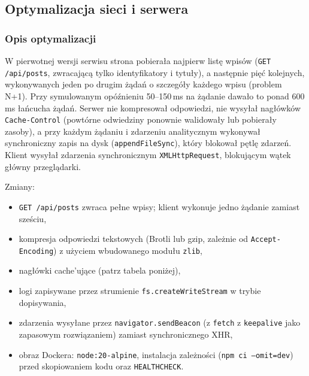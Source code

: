 \makeatletter
{}
\makeatother


\subsection{Optymalizacja sieci i serwera}
\subsubsection{Opis optymalizacji}

W pierwotnej wersji serwisu strona pobierała najpierw listę wpisów (\texttt{GET /api/posts},
zwracającą tylko identyfikatory i tytuły), a następnie pięć kolejnych, wykonywanych
jeden po drugim żądań o szczegóły każdego wpisu (problem N+1). Przy symulowanym opóźnieniu
50--150\,ms na żądanie dawało to ponad 600\,ms łańcucha żądań. Serwer nie kompresował
odpowiedzi, nie wysyłał nagłówków \texttt{Cache-Control} (powtórne odwiedziny
ponownie walidowały lub pobierały zasoby), a przy każdym żądaniu i zdarzeniu
analitycznym wykonywał synchroniczny zapis na dysk (\texttt{appendFileSync}),
który blokował pętlę zdarzeń. Klient wysyłał zdarzenia synchronicznym
\texttt{XMLHttpRequest}, blokującym wątek główny przeglądarki.

Zmiany:
\begin{itemize}
  \item \texttt{GET /api/posts} zwraca pełne wpisy; klient wykonuje jedno żądanie
    zamiast sześciu,
  \item kompresja odpowiedzi tekstowych (Brotli lub gzip, zależnie od
    \texttt{Accept-Encoding}) z użyciem wbudowanego modułu \texttt{zlib},
  \item nagłówki cache'ujące (patrz tabela poniżej),
  \item logi zapisywane przez strumienie \texttt{fs.createWriteStream} w trybie dopisywania,
  \item zdarzenia wysyłane przez \texttt{navigator.sendBeacon} (z \texttt{fetch}
    z \texttt{keepalive} jako zapasowym rozwiązaniem) zamiast synchronicznego XHR,
  \item obraz Dockera: \texttt{node:20-alpine}, instalacja zależności
    (\texttt{npm ci --omit=dev}) przed skopiowaniem kodu oraz \texttt{HEALTHCHECK}.
\end{itemize}

